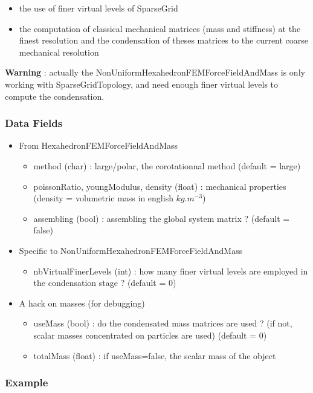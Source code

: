 \begin{itemize}
\item the use of finer virtual levels of SparseGrid
\item the computation of classical mechanical matrices (mass and stiffness) at the finest resolution and the condensation of theses matrices to the current coarse mechanical resolution
\end{itemize}


\textbf{Warning} : actually the NonUniformHexahedronFEMForceFieldAndMass is only working with SparseGridTopology, and need enough finer virtual levels to compute the condensation. 

\subsubsection{Data Fields}

\begin{itemize}
\item From HexahedronFEMForceFieldAndMass
	\begin{itemize}
	\item method (char) : large/polar, the corotationnal method (default = large)
	\item poissonRatio, youngModulus, density (float) : mechanical properties (density = volumetric mass in english $kg.m^{-3}$)
	\item assembling (bool) : assembling the global system matrix ? (default = false)
	\end{itemize}
\item Specific to NonUniformHexahedronFEMForceFieldAndMass
	\begin{itemize}
	\item nbVirtualFinerLevels (int) : how many finer virtual levels are employed in the condensation stage ? (default = 0)
	\end{itemize}
\item A hack on masses (for debugging)
		\begin{itemize}
	\item useMass (bool) : do the condensated mass matrices are used ? (if not, scalar masses concentrated on particles are used) (default = 0)
	\item totalMass (float) : if useMass=false, the scalar mass of the object
	\end{itemize}
\end{itemize}


\subsubsection{Example}



